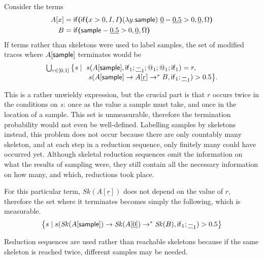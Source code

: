 \begin{example}
Consider the terms
\begin{align*}
A[x] &= \mathsf{if}\boldsymbol{(}\mathsf{if}\boldsymbol{(}x>0, I, I\boldsymbol{)} (\lambda y.\mathsf{sample})\ \underline 0 - \underline{0.5} > 0, \underline 0, \Omega\boldsymbol{)}\\
B &= \mathsf{if}\boldsymbol{(}\mathsf{sample} - \underline{0.5} > 0, \underline 0, \Omega\boldsymbol{)}
\end{align*}
If terms rather than skeletons were used to label samples, the set of modified traces where $A[\mathsf{sample}]$ terminates would be
\[
\begin{array}{l}
\bigcup_{r \in [0,1]} \big\{s \mid\ s(A[\mathsf{sample}], \mathsf{if}_1;\underline{-}_1;@_1;@_1;\mathsf{if}_1) = r, \\
\qquad\qquad\qquad s(A[\mathsf{sample}] \to A[\underline r] \to^* B, \mathsf{if}_1 ; \underline{-}_1) > 0.5 \big\}.
\end{array}
\]
\iffalse
\lo{The occurrence of $L_s(M)$ in the set comprehension below should be $L_0(M)$?}

\lo{I think we should write ``$[A[\tsample], A[\underline r], \ldots, B$'' in the line above as ``$A[\tsample] \to A[\underline r] \to^\ast B$''; similarly $\mathit{Sk}(A[\tsample]) \to \mathit{Sk}(A[\underline 0]) \to^\ast \mathit{Sk}(B)$ below.}
\fi
This is a rather unwieldy expression, but the crucial part is that $r$ occurs twice in the conditions on $s$: once as the value a sample must take, and once in the location of a sample. 
This set is unmeasurable, therefore the termination probability would not even be well-defined. 
Labelling samples by skeletons instead, this problem does not occur because there are only countably many skeleton, and at each step in a reduction sequence, only finitely many could have occurred yet. Although skeletal reduction sequences omit the information on what the results of sampling were, they still contain all the necessary information on how many, and which, reductions took place.

For this particular term, $\mathit{Sk}(A[\underline r])$ does not depend on the value of $r$, therefore the set where it terminates becomes simply the following, which is measurable.
\begin{align*}
\big\{s \mid s(\mathit{Sk}(A[\mathsf{sample}]) \to \mathit{Sk}(A[\underline 0]) \to^* \mathit{Sk}(B), \mathsf{if}_1 ; \underline{-}_1) > 0.5 \big\}
\end{align*}
\end{example}

Reduction sequences are used rather than reachable skeletons because if the same skeleton is reached twice, different samples may be needed. 


